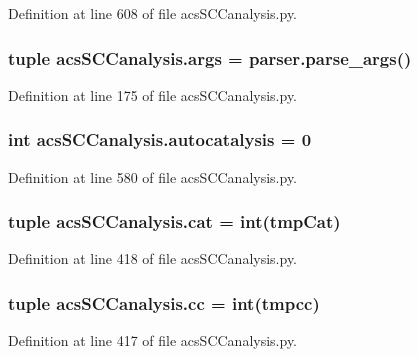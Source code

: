 Definition at line 608 of file acs\-S\-C\-Canalysis.\-py.

\hypertarget{a00128_aa0fabce811f34f18ba6ecbdd5bcbab6a}{
\subsubsection[{args}]{\setlength{\rightskip}{0pt plus 5cm}tuple acs\-S\-C\-Canalysis.\-args = parser.\-parse\-\_\-args()}}\label{a00128_aa0fabce811f34f18ba6ecbdd5bcbab6a}


Definition at line 175 of file acs\-S\-C\-Canalysis.\-py.

\hypertarget{a00128_a70ccd5d519e878c6c8a7d0aa73caf46c}{
\subsubsection[{autocatalysis}]{\setlength{\rightskip}{0pt plus 5cm}int acs\-S\-C\-Canalysis.\-autocatalysis = 0}}\label{a00128_a70ccd5d519e878c6c8a7d0aa73caf46c}


Definition at line 580 of file acs\-S\-C\-Canalysis.\-py.

\hypertarget{a00128_aea872e34fe0da6302f6195f1b2315148}{
\subsubsection[{cat}]{\setlength{\rightskip}{0pt plus 5cm}tuple acs\-S\-C\-Canalysis.\-cat = int(tmp\-Cat)}}\label{a00128_aea872e34fe0da6302f6195f1b2315148}


Definition at line 418 of file acs\-S\-C\-Canalysis.\-py.

\hypertarget{a00128_a67fcb77a15f51e94c98bb48b05865715}{
\subsubsection[{cc}]{\setlength{\rightskip}{0pt plus 5cm}tuple acs\-S\-C\-Canalysis.\-cc = int(tmpcc)}}\label{a00128_a67fcb77a15f51e94c98bb48b05865715}


Definition at line 417 of file acs\-S\-C\-Canalysis.\-py.

